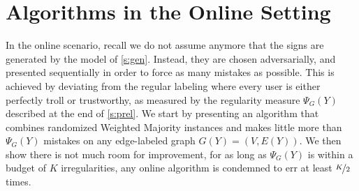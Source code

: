 \section{Algorithms in the Online Setting}\label{s:algonline}

\begin{newcontent}
In the online scenario, recall we do not assume anymore that the signs are generated by the model of
\autoref{s:gen}. Instead, they are chosen adversarially, and presented sequentially in order to
force as many mistakes as possible. This is achieved by deviating from the regular labeling where
every user is either perfectly troll or trustworthy, as measured by the regularity measure
$\Psi_G(Y)$ described at the end of \autoref{s:prel}. We start by presenting an algorithm that
combines randomized Weighted Majority instances and makes little more than $\Psi_G(Y)$ mistakes on
any edge-labeled graph $G(Y) = (V,E(Y))$.  We then show there is not much room for improvement, for
as long as $\Psi_G(Y)$ is within a budget of $K$ irregularities, any online algorithm is condemned
to err at least $\nicefrac{K}{2}$ times.
\end{newcontent}

